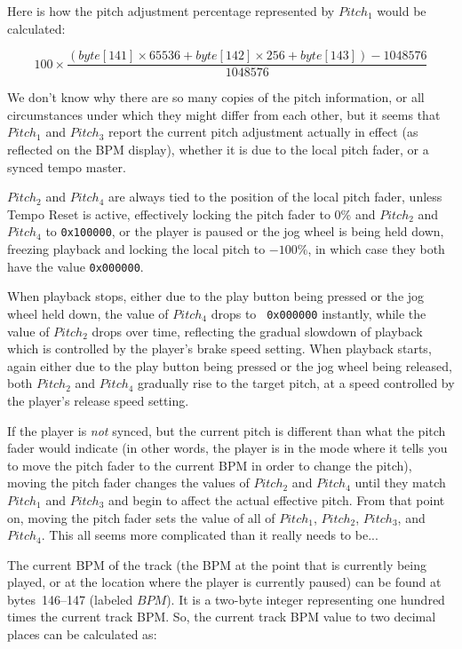 \documentclass[11pt]{article}
\begin{document}
Here is how the pitch adjustment percentage represented by $Pitch_1$
would be calculated:

\begin{displaymath}
  100 \times
  \frac{(byte[141] \times 65536 + byte[142]  \times 256 + byte[143]) - 1048576}{1048576}
\end{displaymath}

We don't know why there are so many copies of the pitch information,
or all circumstances under which they might differ from each other,
but it seems that $Pitch_1$ and $Pitch_3$ report the current pitch
adjustment actually in effect (as reflected on the BPM display),
whether it is due to the local pitch fader, or a synced tempo master.

$Pitch_2$ and $Pitch_4$ are always tied to the position of the local
pitch fader, unless Tempo Reset is active, effectively locking the
pitch fader to 0\% and $Pitch_2$ and $Pitch_4$ to {\tt 0x100000}, or
the player is paused or the jog wheel is being held down, freezing
playback and locking the local pitch to $-100\%$, in which case they
both have the value {\tt 0x000000}.

When playback stops, either due to the play button being pressed or
the jog wheel held down, the value of $Pitch_4$ drops to {\tt
  0x000000} instantly, while the value of $Pitch_2$ drops over time,
reflecting the gradual slowdown of playback which is controlled by the
player's brake speed setting. When playback starts, again either due
to the play button being pressed or the jog wheel being released, both
$Pitch_2$ and $Pitch_4$ gradually rise to the target pitch, at a speed
controlled by the player's release speed setting.

If the player is \emph{not} synced, but the current pitch is different
than what the pitch fader would indicate (in other words, the player
is in the mode where it tells you to move the pitch fader to the
current BPM in order to change the pitch), moving the pitch fader
changes the values of $Pitch_2$ and $Pitch_4$ until they match
$Pitch_1$ and $Pitch_3$ and begin to affect the actual effective
pitch. From that point on, moving the pitch fader sets the value of
all of $Pitch_1$, $Pitch_2$, $Pitch_3$, and $Pitch_4$. This all seems
more complicated than it really needs to be...

The current BPM of the track (the BPM at the point that is currently
being played, or at the location where the player is currently paused)
can be found at bytes~146--147 (labeled $BPM$). It is a two-byte
integer representing one hundred times the current track BPM. So, the
current track BPM value to two decimal places can be calculated as:
\end{document}
